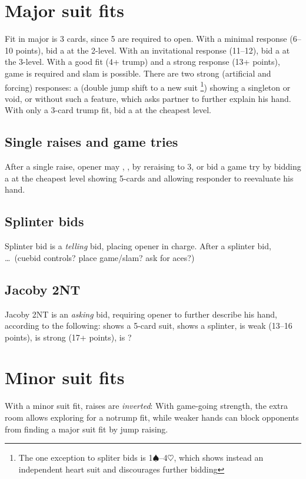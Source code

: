 \documentclass[oneside]{memoir}
\def\H{$\heartsuit$}
\def\S{$\spadesuit$}
\begin{document}
\section{Major suit fits}
Fit in major is 3 cards, since 5 are required to open.  With a minimal
response (6--10 points), bid a  at the
2-level.  With an invitational response (11--12), bid a
 at the 3-level.  With a good fit (4+
trump) and a strong response (13+ points), game is required and slam
is possible.  There are two strong (artificial and forcing) responses:
a  (double jump shift to a new suit%
\footnote{The one exception to spliter bids is 1\S--4\H, which shows
instead an independent heart suit and discourages further bidding})
showing a singleton or void, or  without
such a feature, which asks partner to further explain his hand.  With
only a 3-card trump fit, bid a  at the
cheapest level.

\subsection{Single raises and game tries}
After a single raise, opener may , 
,  by reraising to 3,
or bid a game try by bidding a  at the cheapest level
showing 5-cards and allowing responder to reevaluate his hand.

\subsection{Splinter bids}
Splinter bid is a \emph{telling} bid, placing opener in charge.
After a splinter bid, \ldots\ (cuebid controls?  place game/slam?  ask for aces?)

\subsection{Jacoby 2NT}
Jacoby 2NT is an \emph{asking} bid, requiring opener to further describe his
hand, according to the following:  shows
a 5-card suit,  shows a splinter, 
 is weak (13--16 points), 
 is strong (17+ points), 
is ?


\section{Minor suit fits}
With a minor suit fit, raises are \emph{inverted}: With game-going strength,
the extra room allows exploring for a notrump fit, while weaker hands can
block opponents from finding a major suit fit by jump raising.
\end{document}
